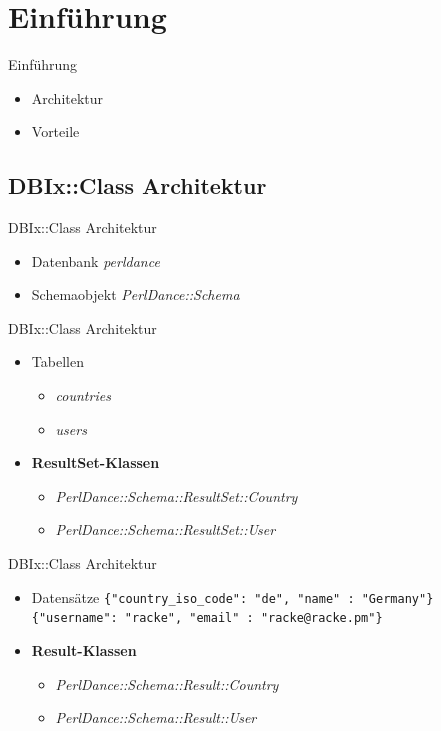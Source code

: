 \section{Einführung}


\begin{frame}{Einführung}
  \begin{itemize}
  \item Architektur
  \item Vorteile
  \end{itemize}
\end{frame}

\subsection{DBIx::Class Architektur}

\begin{frame}{DBIx::Class Architektur}
  \begin{itemize}
  \item Datenbank \textit{perldance}
  \item Schemaobjekt \textit{PerlDance::Schema}
  \end{itemize}
\end{frame}

\begin{frame}[fragile]{DBIx::Class Architektur}
  \begin{itemize}
  \item Tabellen
    \begin{itemize}
    \item \textit{countries}
    \item \textit{users}
    \end{itemize}
  \item \textbf{ResultSet-Klassen}
    \begin{itemize}
      \item \textit{PerlDance::Schema::ResultSet::Country}
      \item \textit{PerlDance::Schema::ResultSet::User}
    \end{itemize}
  \end{itemize}
\end{frame}

\begin{frame}[fragile]{DBIx::Class Architektur}
  \begin{itemize}
  \item Datensätze
    \verb|{"country_iso_code": "de", "name" : "Germany"} |
\verb|{"username": "racke", "email" : "racke@racke.pm"} |

  \item \textbf{Result-Klassen}
    \begin{itemize}
      \item \textit{PerlDance::Schema::Result::Country}
      \item \textit{PerlDance::Schema::Result::User}
    \end{itemize}
  \end{itemize}
\end{frame}


